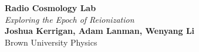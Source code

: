 \documentclass[a0,landscape]{a0poster}
\begin{document}


\begin{minipage}[b]{0.55\linewidth}
\veryHuge \color{NavyBlue} \textbf{Radio Cosmology Lab} \color{Black}\\ %
\Huge\textit{Exploring the Epoch of Reionization}\\[1cm] %
\huge \textbf{Joshua Kerrigan, Adam Lanman, Wenyang Li}\\ %
\huge Brown University Physics\\ %
\end{minipage}



%
%
\end{document}

